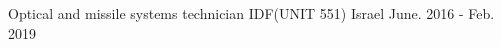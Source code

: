 

\begin{cventries}

  \cventry
    {Optical and missile systems technician} %
    {IDF(UNIT 551)} %
    {Israel} %
    {June. 2016 - Feb. 2019} %
    {
    }
\end{cventries}


